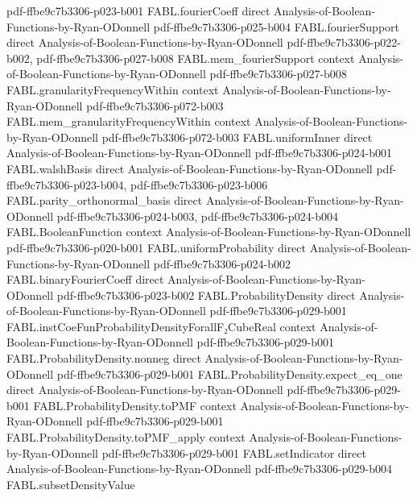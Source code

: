 \begin{theorem}
  {pdf-ffbe9c7b3306-p023-b001}
\proofstep
  {FABL.fourierCoeff}
  {direct}
  {Analysis-of-Boolean-Functions-by-Ryan-ODonnell}
  {pdf-ffbe9c7b3306-p025-b004}
\proofstep
  {FABL.fourierSupport}
  {direct}
  {Analysis-of-Boolean-Functions-by-Ryan-ODonnell}
  {pdf-ffbe9c7b3306-p022-b002,
    pdf-ffbe9c7b3306-p027-b008}
\proofstep
  {FABL.mem_fourierSupport}
  {context}
  {Analysis-of-Boolean-Functions-by-Ryan-ODonnell}
  {pdf-ffbe9c7b3306-p027-b008}
\proofstep
  {FABL.granularityFrequencyWithin}
  {context}
  {Analysis-of-Boolean-Functions-by-Ryan-ODonnell}
  {pdf-ffbe9c7b3306-p072-b003}
\proofstep
  {FABL.mem_granularityFrequencyWithin}
  {context}
  {Analysis-of-Boolean-Functions-by-Ryan-ODonnell}
  {pdf-ffbe9c7b3306-p072-b003}
\proofstep
  {FABL.uniformInner}
  {direct}
  {Analysis-of-Boolean-Functions-by-Ryan-ODonnell}
  {pdf-ffbe9c7b3306-p024-b001}
\proofstep
  {FABL.walshBasis}
  {direct}
  {Analysis-of-Boolean-Functions-by-Ryan-ODonnell}
  {pdf-ffbe9c7b3306-p023-b004,
    pdf-ffbe9c7b3306-p023-b006}
\proofstep
  {FABL.parity_orthonormal_basis}
  {direct}
  {Analysis-of-Boolean-Functions-by-Ryan-ODonnell}
  {pdf-ffbe9c7b3306-p024-b003,
    pdf-ffbe9c7b3306-p024-b004}
\proofstep
  {FABL.BooleanFunction}
  {context}
  {Analysis-of-Boolean-Functions-by-Ryan-ODonnell}
  {pdf-ffbe9c7b3306-p020-b001}
\proofstep
  {FABL.uniformProbability}
  {direct}
  {Analysis-of-Boolean-Functions-by-Ryan-ODonnell}
  {pdf-ffbe9c7b3306-p024-b002}
\proofstep
  {FABL.binaryFourierCoeff}
  {direct}
  {Analysis-of-Boolean-Functions-by-Ryan-ODonnell}
  {pdf-ffbe9c7b3306-p023-b002}
\proofstep
  {FABL.ProbabilityDensity}
  {direct}
  {Analysis-of-Boolean-Functions-by-Ryan-ODonnell}
  {pdf-ffbe9c7b3306-p029-b001}
\proofstep
  {FABL.instCoeFunProbabilityDensityForallF₂CubeReal}
  {context}
  {Analysis-of-Boolean-Functions-by-Ryan-ODonnell}
  {pdf-ffbe9c7b3306-p029-b001}
\proofstep
  {FABL.ProbabilityDensity.nonneg}
  {direct}
  {Analysis-of-Boolean-Functions-by-Ryan-ODonnell}
  {pdf-ffbe9c7b3306-p029-b001}
\proofstep
  {FABL.ProbabilityDensity.expect_eq_one}
  {direct}
  {Analysis-of-Boolean-Functions-by-Ryan-ODonnell}
  {pdf-ffbe9c7b3306-p029-b001}
\proofstep
  {FABL.ProbabilityDensity.toPMF}
  {context}
  {Analysis-of-Boolean-Functions-by-Ryan-ODonnell}
  {pdf-ffbe9c7b3306-p029-b001}
\proofstep
  {FABL.ProbabilityDensity.toPMF_apply}
  {context}
  {Analysis-of-Boolean-Functions-by-Ryan-ODonnell}
  {pdf-ffbe9c7b3306-p029-b001}
\proofstep
  {FABL.setIndicator}
  {direct}
  {Analysis-of-Boolean-Functions-by-Ryan-ODonnell}
  {pdf-ffbe9c7b3306-p029-b004}
\proofstep
  {FABL.subsetDensityValue}

\end{theorem}
